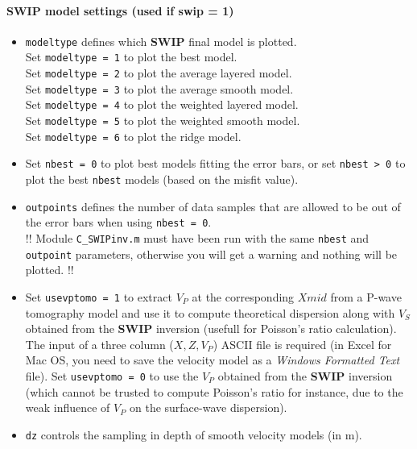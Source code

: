 \documentclass[twoside,a4paper]{article}
\def\SWIP{\textbf{SWIP}}
\begin{document}
\paragraph{SWIP model settings (used if swip = 1)}
\begin{itemize}[leftmargin=*]
\setlength\itemsep{2ex}
\item \verb|modeltype| defines which {\SWIP} final model is plotted.\\[1ex]
Set \verb|modeltype = 1| to plot the best model.\\[1ex]
Set \verb|modeltype = 2| to plot the average layered model.\\[1ex]
Set \verb|modeltype = 3| to plot the average smooth model.\\[1ex]
Set \verb|modeltype = 4| to plot the weighted layered model.\\[1ex]
Set \verb|modeltype = 5| to plot the weighted smooth model.\\[1ex]
Set \verb|modeltype = 6| to plot the ridge model.

\item Set \verb|nbest = 0| to plot best models fitting the error bars, or set \verb|nbest > 0| to plot the best \verb|nbest| models (based on the misfit value). 

\item \verb|outpoints| defines the number of data samples that are allowed to be out of the error bars when using \verb|nbest = 0|.\\[1ex]
!! Module \verb|C_SWIPinv.m| must have been run with the same \verb|nbest| and \verb|outpoint| parameters, otherwise you will get a warning and nothing will be plotted. !!

\item Set \verb|usevptomo = 1| to extract $V_P$ at the corresponding $Xmid$ from a P-wave tomography model and use it to compute theoretical dispersion along with $V_S$ obtained from the {\SWIP} inversion (usefull for Poisson's ratio calculation). The input of a three column ($X,Z,V_P$) ASCII file is required (in Excel for Mac OS, you need to save the velocity model as a \textit{Windows Formatted Text} file). Set \verb|usevptomo = 0| to use the $V_P$ obtained from the {\SWIP} inversion (which cannot be trusted to compute Poisson's ratio for instance, due to the weak influence of $V_P$ on the surface-wave dispersion).

\item \verb|dz| controls the sampling in depth of smooth velocity models (in m).
\end{itemize}
\end{document}
